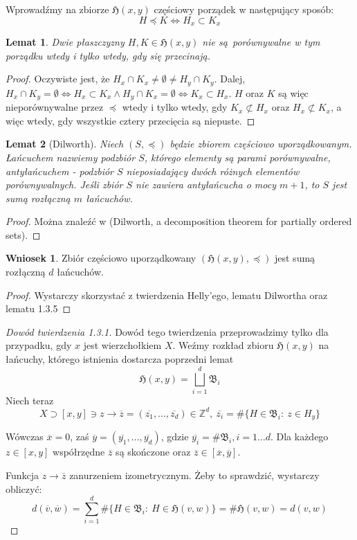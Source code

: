 \documentclass[licencjacka]{pracamgr}
\theoremstyle{definition}
\theoremstyle{definition}
\theoremstyle{definition}
\theoremstyle{definition}
\theoremstyle{definition}
\newtheorem{corollary}{Wniosek}[section]
\theoremstyle{plain}
\newtheorem{lemma}{Lemat}[section]
\theoremstyle{plain}
\begin{document}
Wprowadźmy na zbiorze $ \mathfrak{H}(x,y) $ częściowy porządek w następujący sposób:
$$ H \preceq K \iff H_x \subset K_x $$

\begin{lemma}
	Dwie płaszczyzny $H,K \in \mathfrak{H}(x,y)$ nie są porównywalne w tym 
	porządku wtedy i tylko wtedy, gdy się przecinają.
\end{lemma}
\begin{proof}
	Oczywiste jest, że $ H_x \cap K_x \neq \emptyset \neq H_y \cap K_y $. Dalej, 
	$ H_x \cap K_y = \emptyset \iff H_x \subset K_x  \wedge H_y \cap K_x = \emptyset \iff
	K_x \subset H_x$. $ H $ oraz $ K $ są więc nieporównywalne przez $ \preceq $ wtedy 
	i tylko wtedy, gdy $ K_x \not\subset H_x $ oraz $ H_x \not\subset K_x $, a więc 
	wtedy, gdy wszystkie cztery przecięcia są niepuste.
\end{proof}

\begin{lemma}[Dilworth]
	Niech $ (S, \preceq) $ będzie zbiorem częściowo uporządkowanym. Łańcuchem nazwiemy 
	podzbiór $S $, 
	którego elementy są parami porównywalne, antyłańcuchem - podzbiór $ S $ nieposiadający 
	dwóch różnych elementów porównywalnych. Jeśli zbiór $ S $ nie zawiera antyłańcucha 
	o mocy $ m + 1 $, to $ S $ jest sumą rozłączną $ m $ łańcuchów.
\end{lemma}
\begin{proof}
	Można znaleźć w (Dilworth, a decomposition theorem for partially ordered sets).
\end{proof}
\begin{corollary}
	Zbiór częściowo uporządkowany $ \left(\mathfrak{H}(x,y), \preceq \right) $ 
	jest sumą rozłączną $ d $ 
	łańcuchów.	
\end{corollary}
\begin{proof}
	Wystarczy skorzystać z twierdzenia Helly'ego, lematu Dilwortha oraz 
	lematu 1.3.5 
\end{proof}
\begin{proof}[Dowód twierdzenia 1.3.1]
	Dowód tego twierdzenia przeprowadzimy tylko dla przypadku, gdy $ x $ jest 
	wierzchołkiem $ X $. Weźmy rozkład zbioru $ \mathfrak{H}(x,y)$ na łańcuchy, którego 
	istnienia dostarcza poprzedni lemat
	 $$ \mathfrak{H}(x,y) = \bigsqcup\limits_{i=1}^{d} \mathfrak{B}_i  $$
	Niech teraz 
	$$ X \supset [x,y] \ni z \rightarrow \overline{z} = (\overline{z_1}, \dots, 
	\overline{z_d}) \in \mathbb{Z}^d, ~ \overline{z_i} = \# \{H \in \mathfrak{B}_i: ~ 
	z \in H_y\} $$

	Wówczas $ \overline{x} = 0$, zaś $ \overline{y} = (\overline{y_1}, \dots, 
	\overline{y_d}) $, gdzie $ \overline{y_i} = \# \mathfrak{B}_i, i = 1 \dots d$. 
	Dla każdego $ z \in [x,y] $ współrzędne $ \overline{z} $ są skończone oraz 
	$ \overline{z} \in [\overline{x}, \overline{y}] $.

	Funkcja $ z \rightarrow \overline{z} $ zanurzeniem izometrycznym. Żeby to sprawdzić, 
	wystarczy obliczyć:
	$$ d(\overline{v}, \overline{w}) = \sum\limits_{i=1}^d \# \{ 
	H \in \mathfrak{B}_i: ~ H \in \mathfrak{H}(v,w) \} = \# \mathfrak{H}(v,w) = 
	d(v,w)$$
\end{proof}
\end{document}
